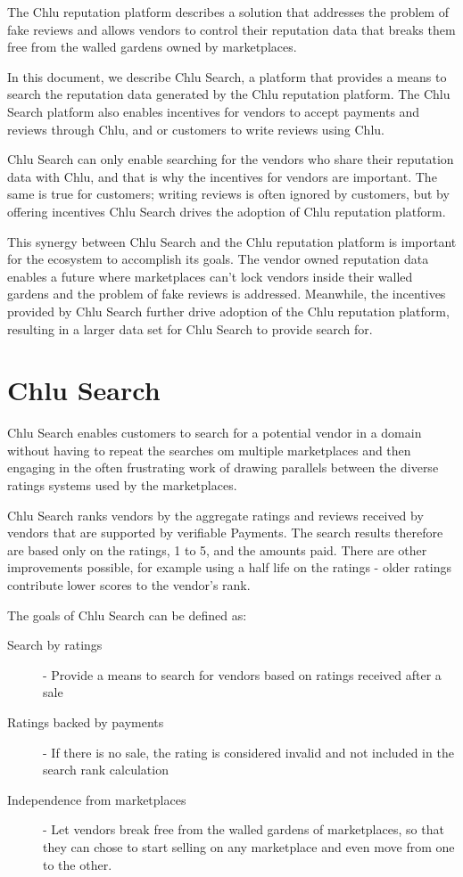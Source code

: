 \documentclass[a4paper]{article}
\begin{document}
The Chlu reputation platform\cite{chlu-reputation} describes a
solution that addresses the problem of fake reviews and allows vendors
to control their reputation data that breaks them free from the walled
gardens owned by marketplaces.

In this document, we describe Chlu Search, a platform that provides a
means to search the reputation data generated by the Chlu reputation
platform. The Chlu Search platform also enables incentives for vendors
to accept payments and reviews through Chlu, and or customers to write
reviews using Chlu.

Chlu Search can only enable searching for the vendors who share their
reputation data with Chlu, and that is why the incentives for vendors
are important. The same is true for customers; writing reviews is
often ignored by customers, but by offering incentives Chlu Search
drives the adoption of Chlu reputation platform.

This synergy between Chlu Search and the Chlu reputation platform is
important for the ecosystem to accomplish its goals. The vendor owned
reputation data enables a future where marketplaces can't lock vendors
inside their walled gardens and the problem of fake reviews is
addressed. Meanwhile, the incentives provided by Chlu Search further
drive adoption of the Chlu reputation platform, resulting in a larger
data set for Chlu Search to provide search for.

\section{Chlu Search}

Chlu Search enables customers to search for a potential vendor in a
domain without having to repeat the searches om multiple marketplaces
and then engaging in the often frustrating work of drawing parallels
between the diverse ratings systems used by the marketplaces.

Chlu Search ranks vendors by the aggregate ratings and reviews
received by vendors that are supported by verifiable Payments. The
search results therefore are based only on the ratings, 1 to 5, and
the amounts paid. There are other improvements possible, for example
using a half life on the ratings - older ratings contribute lower
scores to the vendor's rank.

The goals of Chlu Search can be defined as:

\begin{description}
\item[Search by ratings] - Provide a means to search for vendors based
  on ratings received after a sale
\item[Ratings backed by payments] - If there is no sale, the rating is
  considered invalid and not included in the search rank calculation
\item[Independence from marketplaces] - Let vendors break free from
  the walled gardens of marketplaces, so that they can chose to start
  selling on any marketplace and even move from one to the other.
\end{description}
\end{document}
